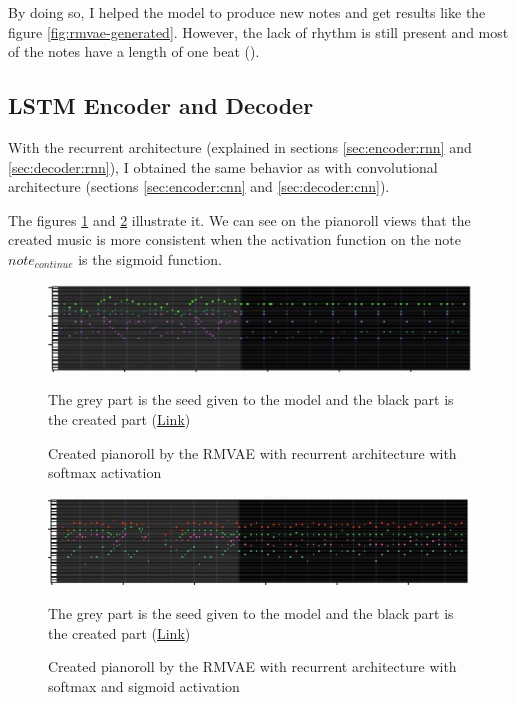 \documentclass[12pt]{report}
\begin{document}
By doing so, I helped the model to produce new notes and get results like the figure \ref{fig:rmvae-generated}.
However, the lack of rhythm is still present and most of the notes have a length of one beat (\musQuarter).


\subsection{LSTM Encoder and Decoder}

With the recurrent architecture (explained in sections \ref{sec:encoder:rnn} and \ref{sec:decoder:rnn}), I obtained the same behavior as with convolutional architecture (sections \ref{sec:encoder:cnn} and \ref{sec:decoder:cnn}).

The figures \ref{fig:pianoroll:rrmvae:no-binary} and \ref{fig:pianoroll:rrmvae:with-binary} illustrate it.
We can see on the pianoroll views that the created music is more consistent when the activation function on the note $note_{continue}$ is the sigmoid function.

\begin{figure}[htbp]
    \centering
    \includegraphics[width=\textwidth]{images/generated_midis/RRMVAE/pianoroll-rrmvae-no-binary.jpg}
    \caption{Created pianoroll by the RMVAE with recurrent architecture with softmax activation}
    The grey part is the seed given to the model and the black part is the created part
    (\href{https://github.com/ValentinVignal/midiGenerator/blob/master/samples/results/lstm_encoder_decoder.mid}{Link})
    \label{fig:pianoroll:rrmvae:no-binary}
\end{figure}

\begin{figure}[htbp]
    \centering
    \includegraphics[width=\textwidth]{images/generated_midis/RRMVAE/pianoroll-rrmvae-with-binary.jpg}
    \caption{Created pianoroll by the RMVAE with recurrent architecture with softmax and sigmoid activation}
    The grey part is the seed given to the model and the black part is the created part
    (\href{https://github.com/ValentinVignal/midiGenerator/blob/master/samples/results/rrmvae-with-binary.mid}{Link})
    \label{fig:pianoroll:rrmvae:with-binary}
\end{figure}
\end{document}
